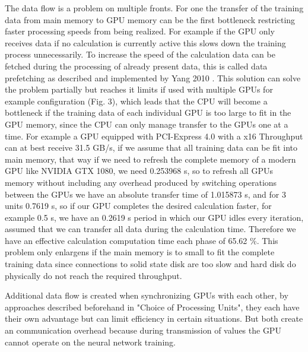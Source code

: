 \documentclass[conference]{IEEEtran}
\begin{document}
The data flow is a problem on multiple fronts. For one the transfer of the training data from main memory to GPU memory can be the first bottleneck restricting faster processing speeds from being realized. For example if the GPU only receives data if no calculation is currently active this slows down the training process unnecessarily. To increase the speed of the calculation data can be fetched during the processing of already present data, this is called data prefetching as described and implemented by Yang 2010 \cite{yang2010gpgpu}. This solution can solve the problem partially but reaches it limits if used with multiple GPUs for example configuration (Fig. 3), which leads that the CPU will become a bottleneck if the training data of each individual GPU is too large to fit in the GPU memory, since the CPU can only manage transfer to the GPUs one at a time. For example a GPU equipped with PCI-Express 4.0 with a x16 Throughput can at best receive 31.5 GB/s, if we assume that all training data can be fit into main memory, that way if we need to refresh the complete memory of a modern GPU like NVIDIA GTX 1080, we need 0.253968 s, so to refresh all GPUs memory without including any overhead produced by switching operations between the GPUs we have an absolute transfer time of 1.015873 s, and for 3 units 0.7619 s, so if our GPU completes the desired calculation faster, for example 0.5 s, we have an 0.2619 s period in which our GPU idles every iteration, assumed that we can transfer all data during the calculation time. Therefore we have an effective calculation computation time each phase of 65.62 \%. This problem only enlargens if the main memory is to small to fit the complete training data since connections to solid state disk are too slow and hard disk do physically do not reach the required throughput.

Additional data flow is created when synchronizing GPUs with each other, by approaches described beforehand in "Choice of Processing Units", they each have their own advantage but can limit efficiency in certain situations. But both create an communication overhead because during transmission of values the GPU cannot operate on the neural network training.
\end{document}
